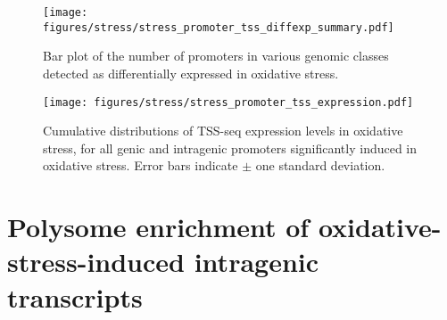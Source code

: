 \begin{figure}[h]
    \texttt{[image: figures/stress/stress\_promoter\_tss\_diffexp\_summary.pdf]}
    \caption[Bar plot of the number of promoters in various genomic classes detected as differentially expressed in oxidative stress.]{Bar plot of the number of promoters in various genomic classes detected as differentially expressed in oxidative stress.}
    \label{fig:stress_promoter_tss_diffexp_summary}
\end{figure}

\begin{figure}[h]
    \texttt{[image: figures/stress/stress\_promoter\_tss\_expression.pdf]}
    \caption[TSS-seq expression levels in oxidative stress of oxidative-stress-induced genic and intragenic promoters.]{Cumulative distributions of TSS-seq expression levels in oxidative stress, for all genic and intragenic promoters significantly induced in oxidative stress. Error bars indicate $\pm$ one standard deviation.}
    \label{fig:stress_promoter_tss_expression}
\end{figure}

\clearpage




\section{Polysome enrichment of oxidative-stress-induced intragenic transcripts}


